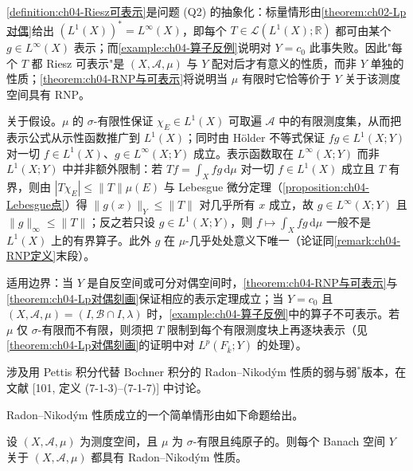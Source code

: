 \documentclass[../../main.tex]{subfiles}%
\begin{document}
\begin{remark}\label{remark:ch04-Riesz可表示定义}
\cref{definition:ch04-Riesz可表示}是问题 (Q2) 的抽象化：标量情形由\cref{theorem:ch02-Lp对偶}给出 $(L^1(X))^*=L^\infty(X)$，即每个 $T\in\mathcal{L}(L^1(X);\mathbb{R})$ 都可由某个 $g\in L^\infty(X)$ 表示；而\cref{example:ch04-算子反例}说明对 $Y=c_0$ 此事失败。因此"每个 $T$ 都 Riesz 可表示"是 $(X,\mathcal{A},\mu)$ 与 $Y$ 配对后才有意义的性质，而非 $Y$ 单独的性质；\cref{theorem:ch04-RNP与可表示}将说明当 $\mu$ 有限时它恰等价于 $Y$ 关于该测度空间具有 RNP。

关于假设。$\mu$ 的 $\sigma$-有限性保证 $\chi_E\in L^1(X)$ 可取遍 $\mathcal{A}$ 中的有限测度集，从而把表示公式从示性函数推广到 $L^1(X)$；同时由 Hölder 不等式保证 $fg\in L^1(X;Y)$ 对一切 $f\in L^1(X)$、$g\in L^\infty(X;Y)$ 成立。表示函数取在 $L^\infty(X;Y)$ 而非 $L^1(X;Y)$ 中并非额外限制：若 $Tf=\int_X fg\,\mathrm{d}\mu$ 对一切 $f\in L^1(X)$ 成立且 $T$ 有界，则由 $|T\chi_E|\leqslant\|T\|\mu(E)$ 与 Lebesgue 微分定理（\cref{proposition:ch04-Lebesgue点}）得 $\|g(x)\|_Y\leqslant\|T\|$ 对几乎所有 $x$ 成立，故 $g\in L^\infty(X;Y)$ 且 $\|g\|_\infty\leqslant\|T\|$；反之若只设 $g\in L^1(X;Y)$，则 $f\mapsto\int_X fg\,\mathrm{d}\mu$ 一般不是 $L^1(X)$ 上的有界算子。此外 $g$ 在 $\mu$-几乎处处意义下唯一（论证同\cref{remark:ch04-RNP定义}末段）。

适用边界：当 $Y$ 是自反空间或可分对偶空间时，\cref{theorem:ch04-RNP与可表示}与\cref{theorem:ch04-Lp对偶刻画}保证相应的表示定理成立；当 $Y=c_0$ 且 $(X,\mathcal{A},\mu)=(I,\mathcal{B}\cap I,\lambda)$ 时，\cref{example:ch04-算子反例}中的算子不可表示。若 $\mu$ 仅 $\sigma$-有限而不有限，则须把 $T$ 限制到每个有限测度块上再逐块表示（见\cref{theorem:ch04-Lp对偶刻画}的证明中对 $L^p(F_{\bar k};Y)$ 的处理）。
\end{remark}

涉及用 Pettis 积分代替 Bochner 积分的 Radon--Nikodým 性质的弱与弱$^*$版本，在文献 [101, 定义 (7-1-3)--(7-1-7)] 中讨论。

Radon--Nikodým 性质成立的一个简单情形由如下命题给出。

\begin{proposition}\label{proposition:ch04-纯原子RNP}
设 $(X,\mathcal{A},\mu)$ 为测度空间，且 $\mu$ 为 $\sigma$-有限且纯原子的。则每个 Banach 空间 $Y$ 关于 $(X,\mathcal{A},\mu)$ 都具有 Radon--Nikodým 性质。
\end{proposition}
\end{document}
